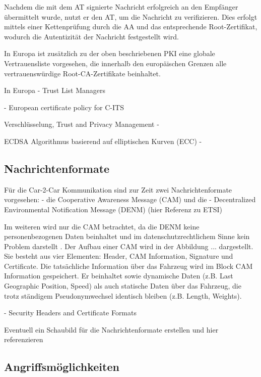 Nachdem die mit dem AT signierte Nachricht erfolgreich an den Empfänger übermittelt wurde, nutzt er den AT, um die Nachricht zu verifizieren. Dies erfolgt mittels einer Kettenprüfung durch die AA und das entsprechende Root-Zertifikat, wodurch die Autentizität der Nachricht festgestellt wird.

In Europa ist zusätzlich zu der oben beschriebenen PKI eine globale Vertrauensliste vorgesehen, die innerhalb den europäischen Grenzen alle vertrauenswürdige Root-CA-Zertifikate beinhaltet.  

In Europa - Trust List Managers

\cite{SecurityCITS} - European certificate policy for C-ITS

Verschlüsselung, Trust and Privacy Management - \cite{ETSI2018}

ECDSA Algorithmus basierend auf elliptischen Kurven (ECC) - \cite{Barker2013}

\subsection{Nachrichtenformate}
\label{sec:FirstContentSection:SecondSubSection}

Für die Car-2-Car Kommunikation sind zur Zeit zwei Nachrichtenformate vorgesehen:
- die Cooperative Awareness Message (CAM) und die 
- Decentralized Environmental Notification Message (DENM) (hier Referenz zu ETSI)

Im weiteren wird nur die CAM betrachtet, da die DENM keine personenbezogenen Daten beinhaltet und im datenschutzrechtlichem Sinne kein Problem darstellt \cite{Kiometzis2017}. Der Aufbau einer CAM wird in der Abbildung ... dargestellt. Sie besteht aus vier Elementen: Header, CAM Information, Signature und Certificate. Die tatsächliche Information über das Fahrzeug wird im Block CAM Information gespeichert. Er beinhaltet sowie dynamische Daten (z.B. Last Geographic Position, Speed) als auch statische Daten über das Fahrzeug, die trotz ständigem Pseudonymwechsel identisch bleiben (z.B. Length, Weights). 








\cite{ETSI2013} - Security Headers and Certificate Formats

Eventuell ein Schaubild für die Nachrichtenformate erstellen und hier referenzieren

\subsection{Angriffsmöglichkeiten}
\label{sec:FirstContentSection:ThirdSubSection}


